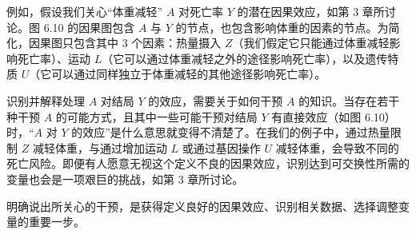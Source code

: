 
例如，假设我们关心“体重减轻” $A$ 对死亡率 $Y$ 的潜在因果效应，如第 3 章所讨论。图 6.10 的因果图包含 $A$ 与 $Y$ 的节点，也包含影响体重的因素的节点。为简化，因果图只包含其中 3 个因素：热量摄入 $Z$（我们假定它只能通过体重减轻影响死亡率）、运动 $L$（它可以通过体重减轻之外的途径影响死亡率），以及遗传特质 $U$（它可以通过同样独立于体重减轻的其他途径影响死亡率）。

\begin{figure}[htbp]
\centering
{}
\caption{}
\label{fig:6.10}
\end{figure}

识别并解释处理 $A$ 对结局 $Y$ 的效应，需要关于如何干预 $A$ 的知识。当存在若干种干预 $A$ 的可能方式，且其中一些可能干预对结局 $Y$ 有直接效应（如图 6.10）时，“$A$ 对 $Y$ 的效应”是什么意思就变得不清楚了。在我们的例子中，通过热量限制 $Z$ 减轻体重，与通过增加运动 $L$ 或通过基因操作 $U$ 减轻体重，会导致不同的死亡风险。即便有人愿意无视这个定义不良的因果效应，识别达到可交换性所需的变量也会是一项艰巨的挑战，如第 3 章所讨论。

明确说出所关心的干预，是获得定义良好的因果效应、识别相关数据、选择调整变量的重要一步。


